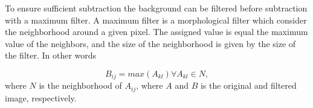 To ensure sufficient subtraction the background can be filtered before subtraction with a maximum filter. A maximum filter is a morphological filter which consider the neighborhood around a given pixel. The assigned value is equal the maximum value of the neighbors, and the size of the neighborhood is given by the size of the filter. In other words

\begin{equation}
B_{ij} = max(A_{kl}) \forall A_{kl} \in N,
\end{equation}
where $N$ is the neighborhood of $A_{ij}$, where $A$ and $B$ is the original and filtered image, respectively. 
%
%
%
%











